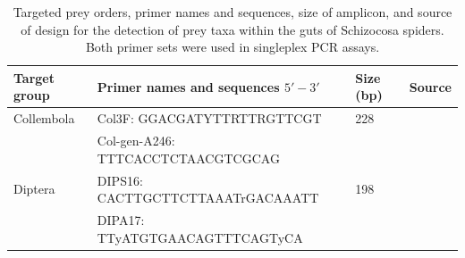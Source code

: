 \documentclass[smallextended]{svjour3}
\begin{document}
\begin{table}
  \label{tab:s1}
  \centering
  \begin{tabular}{llll}
    \hline
    \textbf{Target group} & \textbf{Primer names and sequences} $5'-3'$ & \textbf{Size (bp)} & \textbf{Source}\\
    \hline
    Collembola & Col3F: GGACGATYTTRTTRGTTCGT & 228 & \citet{Sint:2012} \\
    & Col-gen-A246: TTTCACCTCTAACGTCGCAG & & \\
    Diptera & DIPS16: CACTTGCTTCTTAAATrGACAAATT & 198 & \citet{Eitzinger:2014} \\
    & DIPA17: TTyATGTGAACAGTTTCAGTyCA &  & \\
  \end{tabular}
  \caption{Targeted prey orders, primer names and sequences, size of amplicon, and source of design for the detection of prey taxa within the guts of Schizocosa spiders.  Both primer sets were used in singleplex PCR assays.}
\end{table}
\end{document}
